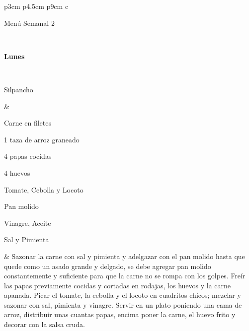 \documentclass[menu.tex]{subfiles}
\begin{document}
            
\begin{tabular} {p{3cm} p{4.5cm} p{9cm}}      
 { c }{\begin{LARGE}Menú Semanal 2\end{LARGE}}\\
\hline
    
\pbox{20cm}
{
    \rule{0pt}{3ex}\begin{large}\textbf{Lunes}\end{large}\\ 
    \rule{0pt}{2ex}Silpancho
} & 
\vspace{-0.4cm}
\begin{compactitem} 
    \begin{footnotesize}
        \item Carne en filetes
        \item 1 taza de arroz graneado
        \item 4 papas cocidas
        \item 4 huevos
        \item Tomate, Cebolla y Locoto
        \item Pan molido
        \item Vinagre, Aceite
        \item Sal y Pimienta 
    \end{footnotesize}
\end{compactitem}&
\vspace{-0.4cm}
Sazonar la carne con sal y pimienta y adelgazar con el pan molido hasta que quede como un asado grande y delgado, se debe agregar pan molido constantemente y suficiente para que la carne no se rompa con los golpes.
Freír las papas previamente cocidas y cortadas en rodajas, los huevos y la carne apanada.
Picar el tomate, la cebolla y el locoto en cuadritos chicos; mezclar y sazonar con sal, pimienta y vinagre.
Servir en un plato poniendo una cama de arroz, distribuir unas cuantas papas, encima poner la carne, el huevo frito y decorar con la salsa cruda.\\
\hline 


\end{tabular}
\end{document}
